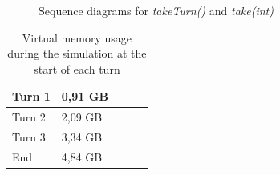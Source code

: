 \documentclass[conference]{IEEEtran}
\begin{document}
\begin{figure}[!t]
	\centering
	\hfil
	\label{fig:take}
	\caption{Sequence diagrams for \textit{takeTurn()} and \textit{take(int)}}
	\label{fig:tt-take}
\end{figure}

\begin{table}[]
	\centering
	\begin{tabular}{|l|l|l|l|l|}
		\hline
		Turn 1 & 0,91 GB  \\ \hline
		Turn 2 & 2,09 GB  \\ \hline
		Turn 3 & 3,34 GB  \\ \hline
		End   & 4,84 GB  \\ \hline
	\end{tabular}
	\caption{Virtual memory usage during the simulation at the start of each turn}
	\label{tab:sim-mem}
\end{table}
\end{document}
